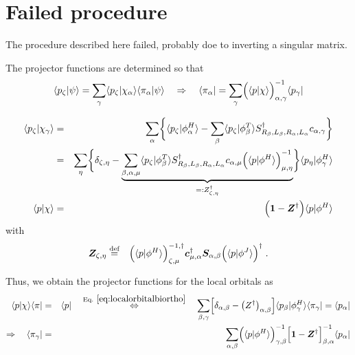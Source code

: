 \documentclass[11pt,a4paper]{report}
\begin{document}
\section{Failed procedure}
The procedure described here failed, probably doe to inverting a
singular matrix.

The projector functions are determined so that
\begin{eqnarray}
\langle{p}_\zeta|\psi\rangle
=
\sum_\gamma
\langle{p}_\zeta|\chi_\alpha\rangle\langle\pi_\alpha|\psi\rangle
\quad
\Rightarrow\quad
\langle\pi_\alpha|=
\sum_\gamma \Bigl(\langle{p}|\chi\rangle\Bigr)^{-1}_{\alpha,\gamma}
\langle{p}_\gamma|
\end{eqnarray}


\begin{eqnarray}
\langle{p}_\zeta|\chi_\gamma\rangle&=&
\sum_\alpha
\biggl\lbrace
\langle{p}_\zeta|\phi^H_\alpha\rangle
-
\sum_\beta 
\langle{p}_\zeta|\phi^T_{\beta}\rangle 
S^\dagger_{R_\beta,L_\beta,R_\alpha,L_\alpha}c_{\alpha,\gamma}
\biggr\rbrace 
\nonumber\\
&=&
\sum_{\eta}
\biggl\lbrace
\delta_{\zeta,\eta}
-
\underbrace{
\sum_{\beta,\alpha,\mu}
\langle{p}_\zeta|\phi^T_{\beta}\rangle S^\dagger_{R_\beta,L_\beta,R_\alpha,L_\alpha}
c_{\alpha,\mu}
\Bigl(\langle{p}|\phi^H\rangle\Bigr)^{-1}_{\mu,\eta}
}_{=:Z^\dagger_{\zeta,\eta}}
\biggr\rbrace  \langle{p}_\eta|\phi^H_\gamma\rangle 
\nonumber\\
%
\langle{p}|\chi\rangle
&=&\Bigl(\mat{1}-\mat{Z}^\dagger\Bigr)\langle{p}|\phi^H\rangle
\label{eq:localorbitalbiortho}
\end{eqnarray}
with
\begin{eqnarray}
\bm{Z}_{\zeta,\eta}&\stackrel{\text{def}}{=}&
\Bigl(\langle{p}|\phi^H\rangle\Bigr)^{-1,\dagger}_{\zeta,\mu}
\bm{c}^\dagger_{\mu,\alpha}
\bm{S}_{\alpha,\beta}
\Bigl(\langle{p}|\phi^J\rangle\Bigr)^\dagger\;.
\label{eq:zmatfromstructureconstants}
\end{eqnarray}

Thus, we obtain the projector functions for the local orbitals as
\begin{eqnarray}
\langle{p}|\chi\rangle\langle\pi|&=&\langle{p}|
%
%
\quad\eqrel{eq:localorbitalbiortho}{\Leftrightarrow}\quad
\sum_{\beta,\gamma}
\Bigl[\delta_{\alpha,\beta}-\left(Z^\dagger\right)_{\alpha,\beta}\Bigr]
\langle{p}_\beta|\phi^H_\gamma\rangle
\langle\pi_\gamma|
=\langle{p}_\alpha|
\nonumber\\
%
\Rightarrow\quad\langle\pi_{\gamma}|&=&
\sum_{\alpha,\beta}
\Bigl(\langle{p}|\phi^H\rangle\Bigr)^{-1}_{\gamma,\beta}
\Bigl[\mat{1}-\mat{Z}^\dagger\Bigr]^{-1}_{\beta,\alpha}  
\langle{p}_\alpha|
\label{eq:chiprojectofintermsofphiprojector}
\end{eqnarray}
\end{document}
